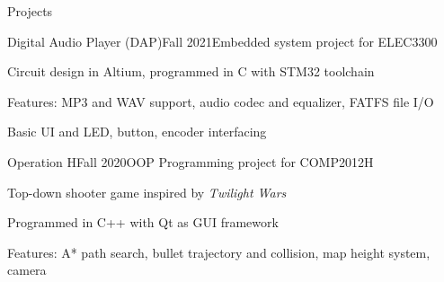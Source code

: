 \documentclass{resume}
\begin{document}
\begin{rSection}{Projects}
    \begin{rSubsection}{Digital Audio Player (DAP)}{Fall 2021}{Embedded system project for ELEC3300}{}
        \item Circuit design in Altium, programmed in C with STM32 toolchain
        \item Features: MP3 and WAV support, audio codec and equalizer, FATFS file I/O
        \item Basic UI and LED, button, encoder interfacing
    \end{rSubsection}

    \begin{rSubsection}{Operation H}{Fall 2020}{OOP Programming project for COMP2012H}{}
        \item Top-down shooter game inspired by \emph{Twilight Wars}
        \item Programmed in C++ with Qt as GUI framework
        \item Features: A* path search, bullet trajectory and collision, map height system, camera
    \end{rSubsection}
\end{rSection}
\end{document}
